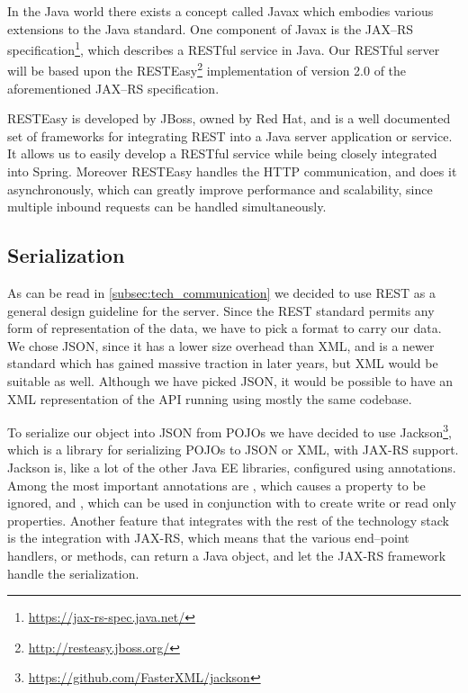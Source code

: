 \bigskip
In the Java world there exists a concept called Javax which embodies various extensions to the Java standard.
One component of Javax is the JAX--RS specification\footnote{\url{https://jax-rs-spec.java.net/}}, which describes a RESTful service in Java.
Our RESTful server will be based upon the RESTEasy\footnote{\url{http://resteasy.jboss.org/}} implementation of version 2.0 of the aforementioned JAX--RS specification.

RESTEasy is developed by JBoss, owned by Red Hat, and is a well documented set of frameworks for integrating REST into a Java server application or service.
It allows us to easily develop a RESTful service while being closely integrated into Spring.
Moreover RESTEasy handles the HTTP communication, and does it asynchronously, which can greatly improve performance and scalability,
since multiple inbound requests can be handled simultaneously.

\subsection{Serialization}\label{subsec:serialization_tech}
As can be read in \cref{subsec:tech_communication} we decided to use REST as a general design guideline for the server.
Since the REST standard permits any form of representation of the data, we have to pick a format to carry our data.
We chose JSON, since it has a lower size overhead than XML, and is a newer standard which has gained massive traction in later years, but XML would be suitable as well.
Although we have picked JSON, it would be possible to have an XML representation of the API running using mostly the same codebase.

To serialize our object into JSON from \acp{POJO} we have decided to use Jackson\footnote{\url{https://github.com/FasterXML/jackson}}, which is a library for serializing \acp{POJO} to JSON or XML, with JAX-RS support.
Jackson is, like a lot of the other \ac{Java EE} libraries, configured using annotations.
Among the most important annotations are , which causes a property to be ignored, and , which can be used in conjunction with  to create write or read only properties.
Another feature that integrates with the rest of the technology stack is the integration with JAX-RS, which means that the various end--point handlers, or methods, can return a Java object, and let the JAX-RS framework handle the serialization.

